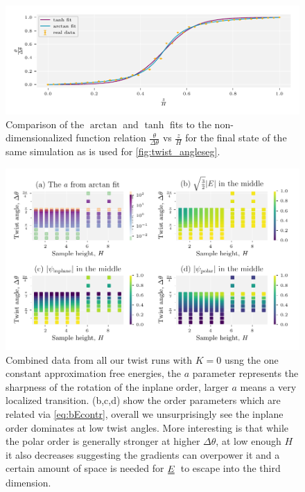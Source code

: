\documentclass[12pt]{article}
\newcommand{\duf}[2]{\stackunder[0.5pt]{\stackunder[0.8pt]{\stackunder[1pt]{\ensuremath{#1}}{\rule{\widthof{\ensuremath{#2}}*\real{0.9}}{.1ex}}}{\rule{\widthof{\ensuremath{#2}}*\real{0.9}}{.1ex}}}{}}
\newcommand{\du}[1]{\duf{#1}{#1}}
\newcommand{\EE}{\ensuremath{\du{E}}}
\begin{document}
        \begin{figure}[t!]
            \begin{center}
                \includegraphics{figures/data_plots/twist_fits.pdf}
            \end{center}
            \caption{
                Comparison of the $\arctan$ and $\tanh$ fits to the non-dimensionalized function relation $\frac{\theta}{\Delta\theta}$ vs $\frac{z}{H}$ for the final state of the same simulation as is used for \cref{fig:twist_angleseg}.
            }\label{fig:twist_fits}
        \end{figure}

        \begin{figure}[t!]
            \begin{center}
                \includegraphics{figures/data_plots/twist_K0_outline.pdf}
            \end{center}
            \caption{
                Combined data from all our twist runs with $K=0$ usng the one constant approximation free energies, the $a$ parameter represents the sharpness of the rotation of the inplane order, larger $a$ means a very localized transition.
                (b,c,d) show the order parameters which are related via \cref{eq:bEcontr}, overall we unsurprisingly see the inplane order dominates at low twist angles.
                More interesting is that while the polar order is generally stronger at higher $\Delta\theta$, at low enough $H$ it also decreases suggesting the gradients can overpower it and a certain amount of space is needed for \EE\ to escape into the third dimension.
            }\label{fig:twist_K0_outline}
        \end{figure}
\end{document}
